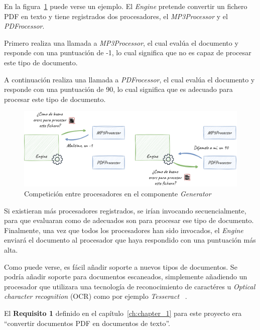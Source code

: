 En la figura~\ref{fig:chapter_4.generator_component_processors} puede verse un ejemplo.
El \textit{Engine} pretende convertir un fichero PDF en texto y tiene registrados dos procesadores, el
\textit{MP3Processor} y el \textit{PDFrocessor}.

Primero realiza una llamada a \textit{MP3Processor}, el cual evalúa el documento y responde con una puntuación
de -1, lo cual significa que no es capaz de procesar este tipo de documento.

A continuación realiza una llamada a \textit{PDFrocessor}, el cual evalúa el documento y responde con una puntuación
de 90, lo cual significa que es adecuado para procesar este tipo de documento.

\begin{figure}[ht]
    \begin{center}
        \includegraphics[width=\textwidth]{./chapter/4/images/chapter_4.generator_component_processors}
        \caption{Competición entre procesadores en el componente \textit{Generator}}
        \label{fig:chapter_4.generator_component_processors}
    \end{center}
\end{figure}

Si existieran más procesadores registrados, se irían invocando secuencialmente, para que evaluaran como de adecuados
son para procesar ese tipo de documento.
Finalmente, una vez que todos los procesadores han sido invocados, el \textit{Engine} enviará el documento al procesador
que haya respondido con una puntuación más alta.

Como puede verse, es fácil añadir soporte a nuevos tipos de documentos.
Se podría añadir soporte para documentos escaneados, simplemente añadiendo un procesador que utilizara una tecnología
de reconocimiento de caractéres u \textit{Optical character recognition} (OCR) como por ejemplo \textit{Tesseract}
~\cite{https://github.com/tesseract-ocr/tesseract}.

El \textbf{Requisito 1} definido en el capítulo~\ref{ch:chapter_1} para este proyecto era ``convertir documentos PDF
en documentos de texto''.

